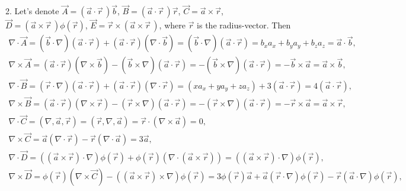 \documentclass[14pt]{article}
\begin{document}
2. Let's denote $\vec{A}=\left(\vec{a}\cdot\vec{r}\,\right)\vec{b}$, $\vec{B}=\left(\vec{a}\cdot\vec{r}\,\right)\vec{r}$, $\vec{C}=\vec{a}\times\vec{r}$, $\vec{D}=\left(\vec{a}\times\vec{r}\,\right)\phi\left(\vec{r}\right)$, $\vec{E}=\vec{r}\times\left(\vec{a}\times\vec{r}\,\right)$, where $\vec{r}$ is the radius-vector. Then
\begin{gather}
  \nabla\cdot\vec{A}=\left(\vec{b}\cdot\nabla\right)\left(\vec{a}\cdot\vec{r}\right)+\left(\vec{a}\cdot\vec{r}\right)\left(\nabla\cdot\vec{b}\right) =\left(\vec{b}\cdot\nabla\right)\left(\vec{a}\cdot\vec{r}\right)=b_x a_x+b_y a_y+b_z a_z=\vec{a}\cdot\vec{b},\nonumber\\
  \nabla\times\vec{A}=\left(\vec{a}\cdot\vec{r}\right)\left(\nabla\times\vec{b}\right)-\left(\vec{b}\times\nabla\right)\left(\vec{a}\cdot\vec{r} \right)=-\left(\vec{b}\times\nabla\right)\left(\vec{a}\cdot\vec{r}\right)=-\vec{b}\times\vec{a}=\vec{a}\times\vec{b},\nonumber\\
  \nabla\cdot\vec{B}=\left(\vec{r}\cdot\nabla\right)\left(\vec{a}\cdot\vec{r}\right)+\left(\vec{a}\cdot\vec{r}\right)\left(\nabla\cdot\vec{r}\right) =\left(x a_x+y a_y+z a_z\right)+3\left(\vec{a}\cdot\vec{r}\right)=4\left(\vec{a}\cdot\vec{r}\right),\nonumber\\
  \nabla\times\vec{B}=\left(\vec{a}\cdot\vec{r}\right)\left(\nabla\times\vec{r}\right)-\left(\vec{r}\times\nabla\right)\left(\vec{a}\cdot\vec{r} \right)=-\left(\vec{r}\times\nabla\right)\left(\vec{a}\cdot\vec{r}\right)=-\vec{r}\times\vec{a}=\vec{a}\times\vec{r},\nonumber\\
  \nabla\cdot\vec{C}=\left(\nabla,\vec{a},\vec{r}\right)=\left(\vec{r},\nabla,\vec{a}\right)=\vec{r}\cdot\left(\nabla\times\vec{a}\right)=0,\nonumber\\
  \nabla\times\vec{C}=\vec{a}\left(\nabla\cdot\vec{r}\right)-\vec{r}\left(\nabla\cdot\vec{a}\right)=3\vec{a},\nonumber\\
  \nabla\cdot\vec{D}=\left(\left(\vec{a}\times\vec{r}\right)\cdot\nabla\right)\phi\left(\vec{r}\right)+\phi\left(\vec{r}\right)\left(\nabla\cdot\left(\vec{a}\times\vec{r}\right)\right) =\left(\left(\vec{a}\times\vec{r}\right)\cdot\nabla\right)\phi\left(\vec{r}\right),\nonumber\\
  \nabla\times\vec{D}=\phi\left(\vec{r}\right)\left(\nabla\times\vec{C}\right)-\left(\left(\vec{a}\times\vec{r}\right)\times\nabla\right) \phi\left(\vec{r}\right)=3\phi\left(\vec{r}\right)\vec{a}+\vec{a}\left(\vec{r}\cdot\nabla\right)\phi\left(\vec{r}\right)- \vec{r}\left(\vec{a}\cdot\nabla\right)\phi\left(\vec{r}\right),\nonumber
\end{gather}
\end{document}
